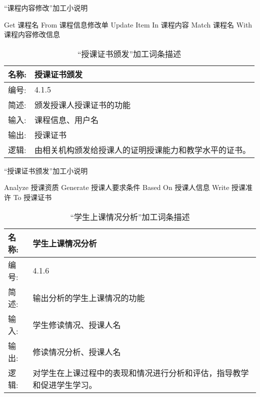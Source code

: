 \begin{algorithm}[H] 
    \renewcommand{\thealgorithm}{}
    \caption{“课程内容修改”加工小说明} 
    \label{alg3} 
    \begin{algorithmic}[1]
        \STATE Get 课程名 From 课程信息修改单
        \STATE Update Item In 课程内容 Match 课程名 With 课程内容修改信息
    \end{algorithmic} 
\end{algorithm}

\begin{table}[H]  
\caption{“授课证书颁发”加工词条描述}  
\begin{center}  
    \begin{tabular}{l p{11cm}} 
        \hline
        \quad 名称: & 授课证书颁发 \\
        \hline
        \quad 编号: & 4.1.5 \\
        \hline
        \quad 简述: & 颁发授课人授课证书的功能 \\
        \hline
        \quad 输入: & 课程信息、用户名 \\
        \hline
        \quad 输出: & 授课证书 \\
        \hline
        \quad 逻辑: & 由相关机构颁发给授课人的证明授课能力和教学水平的证书。 \\
        \hline
    \end{tabular}
    \label{tab1}
\end{center}
\end{table}


\begin{algorithm}[H]
    \renewcommand{\thealgorithm}{}
    \caption{“授课证书颁发”加工小说明} 
    \label{alg3} 
    \begin{algorithmic}[1]
        \STATE Analyze 授课资质
        \STATE Generate 授课人要求条件 Based On 授课人信息
        \STATE Write 授课准许 To 授课证书
    \end{algorithmic} 
\end{algorithm}

\begin{table}[H]  
\caption{“学生上课情况分析”加工词条描述}  
\begin{center}  
    \begin{tabular}{l p{11cm}} 
        \hline
        \quad 名称: & 学生上课情况分析 \\
        \hline
        \quad 编号: & 4.1.6 \\
        \hline
        \quad 简述: & 输出分析的学生上课情况的功能 \\
        \hline
        \quad 输入: & 学生修读情况、授课人名 \\
        \hline
        \quad 输出: & 修读情况分析、授课人名 \\
        \hline
        \quad 逻辑: & 对学生在上课过程中的表现和情况进行分析和评估，指导教学和促进学生学习。 \\
        \hline
    \end{tabular}
    \label{tab1}
\end{center}
\end{table}



